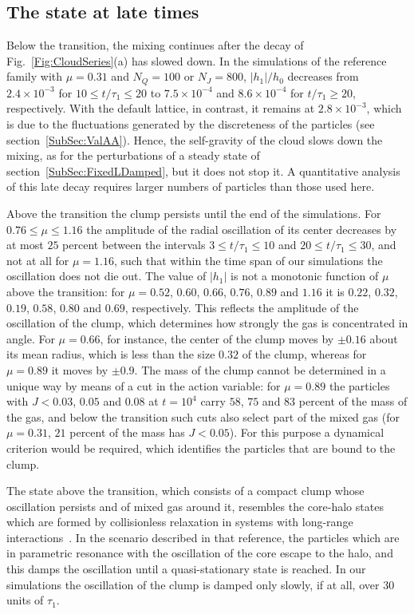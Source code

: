 \subsection{The state at late times}
\label{SubSec:FarLate}

Below the transition, the mixing continues after the decay of Fig.~\ref{Fig:CloudSeries}(a) has slowed down. In the simulations of the reference family with $\mu = 0.31$ and $N_Q = 100$ or $N_J = 800$, $|h_1|/h_0$ decreases from $2.4\times 10^{-3}$ for $10\leq t/\tau_1\leq 20$ to $7.5\times 10^{-4}$ and $8.6\times 10^{-4}$ for $t/\tau_1\geq 20$, respectively. With the default lattice, in contrast, it remains at $2.8\times 10^{-3}$, which is due to the fluctuations generated by the discreteness of the particles (see section~\ref{SubSec:ValAA}). Hence, the self-gravity of the cloud slows down the mixing, as for the perturbations of a steady state of section~\ref{SubSec:FixedLDamped}, but it does not stop it. A quantitative analysis of this late decay requires larger numbers of particles than those used here. 

Above the transition the clump persists until the end of the simulations. For $0.76\leq\mu\leq 1.16$ the amplitude of the radial oscillation of its center decreases by at most $25$ percent between the intervals $3\leq t/\tau_1\leq 10$ and $20\leq t/\tau_1\leq 30$, and not at all for $\mu = 1.16$, such that within the time span of our simulations the oscillation does not die out. The value of $|h_1|$ is not a monotonic function of $\mu$ above the transition: for $\mu = 0.52$, $0.60$, $0.66$, $0.76$, $0.89$ and $1.16$ it is $0.22$, $0.32$, $0.19$, $0.58$, $0.80$ and $0.69$, respectively. This reflects the amplitude of the oscillation of the clump, which determines how strongly the gas is concentrated in angle. For $\mu = 0.66$, for instance, the center of the clump moves by $\pm 0.16$ about its mean radius, which is less than the size $0.32$ of the clump, whereas for $\mu = 0.89$ it moves by $\pm 0.9$. The mass of the clump cannot be determined in a unique way by means of a cut in the action variable: for $\mu = 0.89$ the particles with $J < 0.03$, $0.05$ and $0.08$ at $t = 10^4$ carry $58$, $75$ and $83$ percent of the mass of the gas, and below the transition such cuts also select part of the mixed gas (for $\mu = 0.31$, $21$ percent of the mass has $J < 0.05$). For this purpose a dynamical criterion would be required, which identifies the particles that are bound to the clump. 

The state above the transition, which consists of a compact clump whose oscillation persists and of mixed gas around it, resembles the core-halo states which are formed by collisionless relaxation in systems with long-range interactions~\cite{yLrPfRtTfB14}. In the scenario described in that reference, the particles which are in parametric resonance with the oscillation of the core escape to the halo, and this damps the oscillation until a quasi-stationary state is reached. In our simulations the oscillation of the clump is damped only slowly, if at all, over $30$ units of $\tau_1$.
